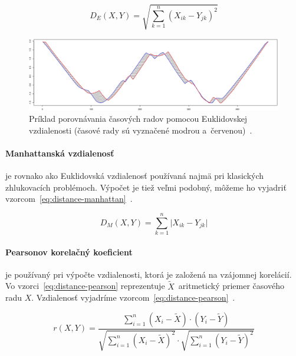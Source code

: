 \documentclass[a4paper,twoside,slovak,12pt,appendix]{article}
\begin{document}
\begin{equation}
	\label{eq:distance-euclidean}
  D_E \left( X, Y \right) = \sqrt{\sum_{k=1}^{n} \left( X_{ik} - Y_{jk} \right)^2 }
\end{equation}

\begin{figure}[htbp]
  \centering
  \includegraphics[width=\textwidth]{euclidean_distance.png}
  \caption[Príklad porovnávania časových radov pomocou Euklidovskej vzdialenosti.]{Príklad porovnávania časových radov pomocou Euklidovskej vzdialenosti (časové rady sú vyznačené modrou a~červenou)~\cite{Malinowski2017}.}
  \label{fig:euclidean-distance}
\end{figure}

\paragraph{Manhattanská vzdialenosť} je rovnako ako Euklidovská vzdialenosť
používaná najmä pri klasických zhlukovacích problémoch. Výpočet je tiež veľmi
podobný, môžeme ho vyjadriť vzorcom~\ref{eq:distance-manhattan}~\cite{Craw2017}.

\begin{equation}
	\label{eq:distance-manhattan}
  D_M \left( X, Y \right) = \sum_{k=1}^{n} \lvert X_{ik} - Y_{jk} \rvert
\end{equation}

\paragraph{Pearsonov korelačný koeficient} je používaný pri výpočte
vzdialenosti, ktorá je založená na vzájomnej korelácií. Vo
vzorci~\ref{eq:distance-pearson} reprezentuje $\widetilde{X}$~aritmetický
priemer časového radu $X$. Vzdialenosť vyjadríme
vzorcom~\ref{eq:distance-pearson}~\cite{WarrenLiao2005}.

\begin{equation}
	\label{eq:distance-pearson}
  r \left( X, Y \right) = \frac
  { \sum_{i=1}^{n} \left( X_{i} - \widetilde{X} \right) \cdot \left( Y_{i} - \widetilde{Y} \right) }
  { \sqrt{\sum_{i=1}^{n} \left( X_{i} - \widetilde{X} \right)^2 } \cdot \sqrt{\sum_{i=1}^{n} \left( Y_{i} - \widetilde{Y} \right)^2 } }
\end{equation}
\end{document}
